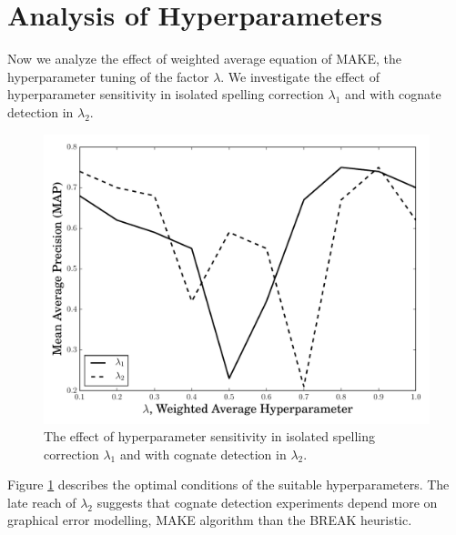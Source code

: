 \section{Analysis of Hyperparameters}

Now we analyze the effect of weighted average equation of MAKE, the hyperparameter tuning of the factor $\lambda$.
We investigate the effect of hyperparameter sensitivity in isolated spelling correction $\lambda_1$ and with cognate detection in $\lambda_2$.
\begin{figure}[h]
	\centering
	\includegraphics[width=\textwidth]{gfx/phew1.pdf}
	\caption{The effect of hyperparameter sensitivity in isolated spelling correction $\lambda_1$ and with cognate detection in $\lambda_2$.}
	\label{phew1}
\end{figure}

Figure \ref{phew1} describes the optimal conditions of the suitable hyperparameters.
The late reach of $\lambda_2$ suggests that cognate detection experiments depend more on graphical error modelling, MAKE algorithm than the BREAK heuristic.